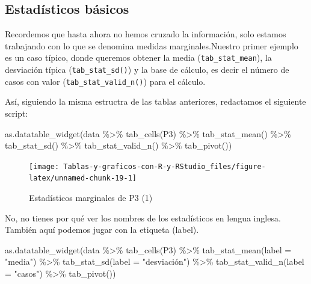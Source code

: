 \documentclass[
]{book}
\newenvironment{Shaded}{\begin{snugshade}}{\end{snugshade}}
\newcommand{\AttributeTok}[1]{\textcolor[rgb]{0.77,0.63,0.00}{#1}}
\newcommand{\FunctionTok}[1]{\textcolor[rgb]{0.00,0.00,0.00}{#1}}
\newcommand{\NormalTok}[1]{#1}
\newcommand{\SpecialCharTok}[1]{\textcolor[rgb]{0.00,0.00,0.00}{#1}}
\newcommand{\StringTok}[1]{\textcolor[rgb]{0.31,0.60,0.02}{#1}}
\begin{document}
\hypertarget{estaduxedsticos-buxe1sicos}{%
\subsection{Estadísticos básicos}\label{estaduxedsticos-buxe1sicos}}

Recordemos que hasta ahora no hemos cruzado la información, solo estamos trabajando con lo que se denomina medidas marginales.Nuestro primer ejemplo es un caso típico, donde queremos obtener la media (\texttt{tab\_stat\_mean}), la desviación típica (\texttt{tab\_stat\_sd()}) y la base de cálculo, es decir el número de casos con valor (\texttt{tab\_stat\_valid\_n()}) para el cálculo.

Así, siguiendo la misma estructra de las tablas anteriores, redactamos el siguiente script:

\begin{Shaded}
\begin{Highlighting}[]
\FunctionTok{as.datatable\_widget}\NormalTok{(data }\SpecialCharTok{\%\textgreater{}\%}
  \FunctionTok{tab\_cells}\NormalTok{(P3) }\SpecialCharTok{\%\textgreater{}\%}
  \FunctionTok{tab\_stat\_mean}\NormalTok{() }\SpecialCharTok{\%\textgreater{}\%}
  \FunctionTok{tab\_stat\_sd}\NormalTok{() }\SpecialCharTok{\%\textgreater{}\%}
  \FunctionTok{tab\_stat\_valid\_n}\NormalTok{() }\SpecialCharTok{\%\textgreater{}\%}
  \FunctionTok{tab\_pivot}\NormalTok{())}
\end{Highlighting}
\end{Shaded}

\begin{figure}[H]

{\centering \texttt{[image: Tablas-y-graficos-con-R-y-RStudio\_files/figure-latex/unnamed-chunk-19-1]} 

}

\caption{Estadísticos marginales de P3 (1)}\label{fig:unnamed-chunk-19}
\end{figure}

No, no tienes por qué ver los nombres de los estadísticos en lengua inglesa. También aquí podemos jugar con la etiqueta (label).

\begin{Shaded}
\begin{Highlighting}[]
\FunctionTok{as.datatable\_widget}\NormalTok{(data }\SpecialCharTok{\%\textgreater{}\%}
  \FunctionTok{tab\_cells}\NormalTok{(P3) }\SpecialCharTok{\%\textgreater{}\%}
  \FunctionTok{tab\_stat\_mean}\NormalTok{(}\AttributeTok{label =} \StringTok{"media"}\NormalTok{) }\SpecialCharTok{\%\textgreater{}\%}
  \FunctionTok{tab\_stat\_sd}\NormalTok{(}\AttributeTok{label =} \StringTok{"desviación"}\NormalTok{) }\SpecialCharTok{\%\textgreater{}\%}
  \FunctionTok{tab\_stat\_valid\_n}\NormalTok{(}\AttributeTok{label =} \StringTok{"casos"}\NormalTok{) }\SpecialCharTok{\%\textgreater{}\%}
  \FunctionTok{tab\_pivot}\NormalTok{())}
\end{Highlighting}
\end{Shaded}
\end{document}
